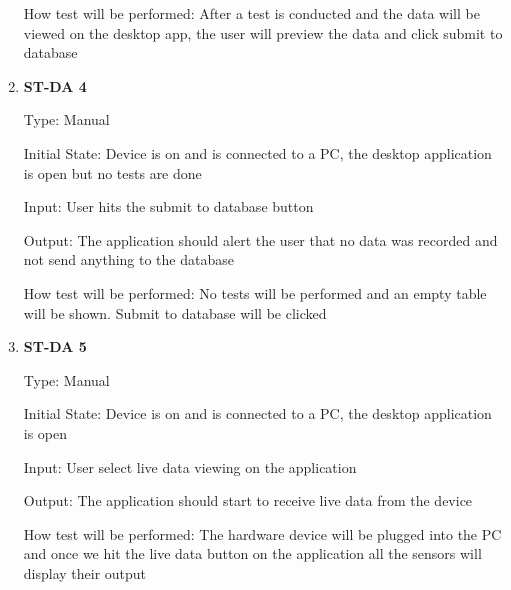 \documentclass[12pt, titlepage]{article}
\begin{document}
\begin{enumerate}
            
  How test will be performed: After a test is conducted and the data will be viewed on the desktop app, the user will preview the data and click submit to database \\

  \item{\bf{ST-DA 4}}
  
  Type: Manual
            
  Initial State: Device is on and is connected to a PC, the desktop application is open but no tests are done
            
  Input: User hits the submit to database button
            
  Output: The application should alert the user that no data was recorded and not send anything to the database
  
            
  How test will be performed: No tests will be performed and an empty table will be shown. Submit to database will be clicked \\

  \item{\bf{ST-DA 5}}
  
  Type: Manual
            
  Initial State: Device is on and is connected to a PC, the desktop application is open
            
  Input: User select live data viewing on the application
            
  Output: The application should start to receive live data from the device
  
            
  How test will be performed: The hardware device will be plugged into the PC and once we hit the live data button on the application all the sensors will display their output\\
  

\end{enumerate}
\end{document}
